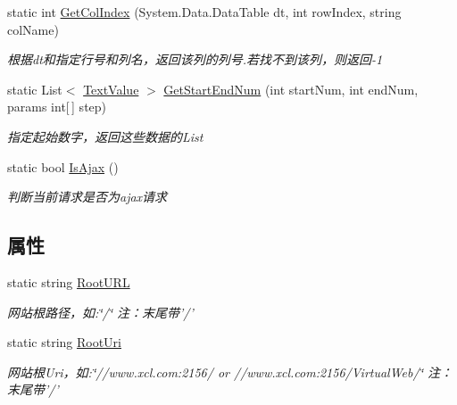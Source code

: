 \begin{DoxyCompactItemize}
static int \hyperlink{class_x_c_l_net_tools_1_1_string_hander_1_1_common_a92809793a5182f189efcfcb49a3f8bc8}{Get\-Col\-Index} (System.\-Data.\-Data\-Table dt, int row\-Index, string col\-Name)
\begin{DoxyCompactList}\small\item\em 根据dt和指定行号和列名，返回该列的列号.\-若找不到该列，则返回-\/1 \end{DoxyCompactList}\item 
static List$<$ \hyperlink{class_x_c_l_net_tools_1_1_entity_1_1_text_value}{Text\-Value} $>$ \hyperlink{class_x_c_l_net_tools_1_1_string_hander_1_1_common_a34f200ef899d3b8ff3bff707f86c24d2}{Get\-Start\-End\-Num} (int start\-Num, int end\-Num, params int\mbox{[}$\,$\mbox{]} step)
\begin{DoxyCompactList}\small\item\em 指定起始数字，返回这些数据的\-List \end{DoxyCompactList}\item 
static bool \hyperlink{class_x_c_l_net_tools_1_1_string_hander_1_1_common_a2573b0ab4c60ce76ab6713ed40339db4}{Is\-Ajax} ()
\begin{DoxyCompactList}\small\item\em 判断当前请求是否为ajax请求 \end{DoxyCompactList}\end{DoxyCompactItemize}
\subsection*{属性}
\begin{DoxyCompactItemize}
\item 
static string \hyperlink{class_x_c_l_net_tools_1_1_string_hander_1_1_common_a87e9775b7bdaaf9bc205a148b1335ee2}{Root\-U\-R\-L}
\begin{DoxyCompactList}\small\item\em 网站根路径，如\-:\char`\"{}/\char`\"{} 注：末尾带'/' \end{DoxyCompactList}\item 
static string \hyperlink{class_x_c_l_net_tools_1_1_string_hander_1_1_common_ae924e6a3e073efd4a75d53ea7095f976}{Root\-Uri}
\begin{DoxyCompactList}\small\item\em 网站根\-Uri，如\-:\char`\"{}//www.\-xcl.\-com\-:2156/ or //www.\-xcl.\-com\-:2156/\-Virtual\-Web/\char`\"{} 注：末尾带'/' \end{DoxyCompactList}\end{DoxyCompactItemize}


